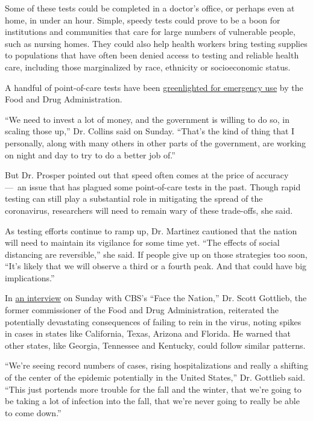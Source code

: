 Some of these tests could be completed in a doctor's office, or perhaps
even at home, in under an hour. Simple, speedy tests could prove to be a
boon for institutions and communities that care for large numbers of
vulnerable people, such as nursing homes. They could also help health
workers bring testing supplies to populations that have often been
denied access to testing and reliable health care, including those
marginalized by race, ethnicity or socioeconomic status.

A handful of point-of-care tests have been
\href{https://www.fda.gov/medical-devices/coronavirus-disease-2019-covid-19-emergency-use-authorizations-medical-devices/vitro-diagnostics-euas\#imft1}{greenlighted
for emergency use} by the Food and Drug Administration.

``We need to invest a lot of money, and the government is willing to do
so, in scaling those up,'' Dr. Collins said on Sunday. ``That's the kind
of thing that I personally, along with many others in other parts of the
government, are working on night and day to try to do a better job of.''

But Dr. Prosper pointed out that speed often comes at the price of
accuracy ---~an issue that has plagued some point-of-care tests in the
past. Though rapid testing can still play a substantial role in
mitigating the spread of the coronavirus, researchers will need to
remain wary of these trade-offs, she said.

As testing efforts continue to ramp up, Dr. Martinez cautioned that the
nation will need to maintain its vigilance for some time yet. ``The
effects of social distancing are reversible,'' she said. If people give
up on those strategies too soon, ``It's likely that we will observe a
third or a fourth peak. And that could have big implications.''

In
\href{https://www.cbsnews.com/news/transcript-scott-gottlieb-discusses-coronavirus-on-face-the-nation-july-19-2020/}{an
interview} on Sunday with CBS's ``Face the Nation,'' Dr. Scott Gottlieb,
the former commissioner of the Food and Drug Administration, reiterated
the potentially devastating consequences of failing to rein in the
virus, noting spikes in cases in states like California, Texas, Arizona
and Florida. He warned that other states, like Georgia, Tennessee and
Kentucky, could follow similar patterns.

``We're seeing record numbers of cases, rising hospitalizations and
really a shifting of the center of the epidemic potentially in the
United States,'' Dr. Gottlieb said. ``This just portends more trouble
for the fall and the winter, that we're going to be taking a lot of
infection into the fall, that we're never going to really be able to
come down.''

